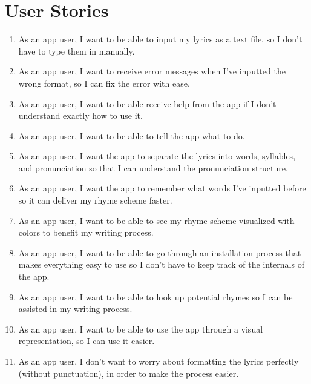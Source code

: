 \documentclass[12pt,a4paper]{report}
\begin{document}
\section{User Stories}
\begin{enumerate}

    \item As an app user, I want to be able to input my lyrics as a text file, so I don't have to type them in manually.
    \item As an app user, I want to receive error messages when I've inputted the wrong format, so I can fix the error with ease.
    \item As an app user, I want to be able receive help from the app if I don't understand exactly how to use it.
    \item As an app user, I want to be able to tell the app what to do.
    \item As an app user, I want the app to separate the lyrics into words, syllables, and pronunciation so that I can understand the pronunciation structure.
    \item As an app user, I want the app to remember what words I've inputted before so it can deliver my rhyme scheme faster.
    \item As an app user, I want to be able to see my rhyme scheme visualized with colors to benefit my writing process.
    \item As an app user, I want to be able to go through an installation process that makes everything easy to use so I don't have to keep track of the internals of the app.
    \item As an app user, I want to be able to look up potential rhymes so I can be assisted in my writing process.
    \item As an app user, I want to be able to use the app through a visual representation, so I can use it easier.
    \item As an app user, I don't want to worry about formatting the lyrics perfectly (without punctuation), in order to make the process easier.
\end{enumerate}
\end{document}
